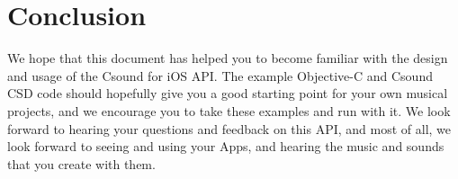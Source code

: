 \documentclass[11pt]{article}
\begin{document}

\section{Conclusion}

We hope that this document has helped you to become familiar with the design and usage of the Csound for iOS API. The example Objective-C and Csound CSD code should hopefully give you a good starting point for your own musical projects, and we encourage you to take these examples and run with it.  We look forward to hearing your questions and feedback on this API, and most of all, we look forward to seeing and using your Apps, and hearing the music and sounds that you create with them.
\end{document}
